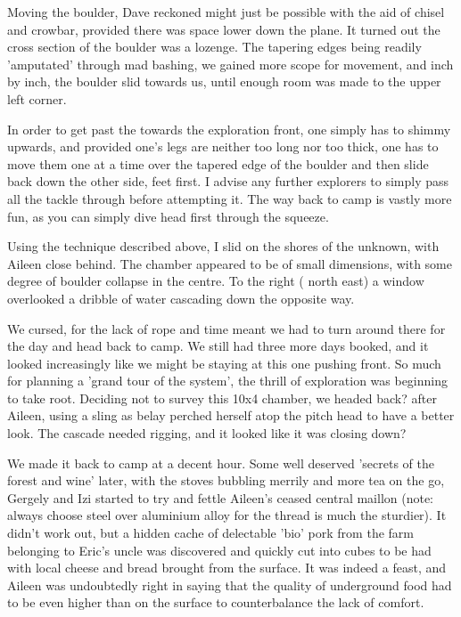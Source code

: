 Moving the boulder, Dave reckoned might just be possible with the aid of chisel and crowbar, provided there was space lower down the plane. It turned out the cross section of the boulder was a lozenge. The tapering edges being readily 'amputated' through mad bashing, we gained more scope for movement, and inch by inch, the boulder slid towards us, until enough room was made to the upper left corner.

In order to get past the  towards the exploration front, one simply has to shimmy upwards, and provided one's legs are neither too long nor too thick, one has to move them one at a time over the tapered edge of the boulder and then slide back down the other side, feet first. I advise any further explorers to simply pass all the tackle through before attempting it. The way back to camp is vastly more fun, as you can simply dive head first through the squeeze.

Using the technique described above, I slid on the shores of the unknown, with Aileen close behind. The chamber appeared to be of small dimensions, with some degree of boulder collapse in the centre. To the right ( north east) a window overlooked a dribble of water cascading down the opposite way.

We cursed, for the lack of rope and time meant we had to turn around there for the day and head back to camp. We still had three more days booked, and it looked increasingly like we might be staying at this one pushing front. So much for planning a 'grand tour of the system', the thrill of exploration was beginning to take root. Deciding not to survey this 10x4 chamber, we headed back? after Aileen, using a sling as belay perched herself atop the pitch head to have a better look. The cascade needed rigging, and it looked like it was closing down?

We made it back to camp at a decent hour. Some well deserved 'secrets of the forest and wine' later, with the stoves bubbling merrily and more tea on the go, Gergely and Izi started to try and fettle Aileen's ceased central maillon (note: always choose steel over aluminium alloy for the thread is much the sturdier). It didn't work out, but a hidden cache of delectable 'bio' pork from the farm belonging to Eric's uncle was discovered and quickly cut into cubes to be had with local cheese and bread brought from the surface. It was indeed a feast, and Aileen was undoubtedly right in saying that the quality of underground food had to be even higher than on the surface to counterbalance the lack of comfort.

